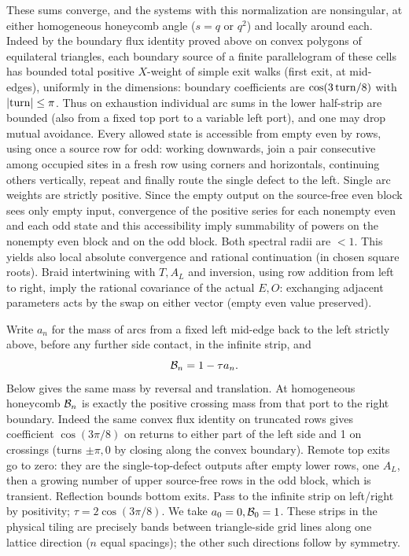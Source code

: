 \documentclass[11pt]{article}
\numberwithin{equation}{section}
\theoremstyle{definition}\newtheorem{definition}[theorem]{Definition}
\theoremstyle{remark}\newtheorem{remark}[theorem]{Remark}
\begin{document}
These sums converge, and the systems with this normalization are nonsingular, at either homogeneous honeycomb angle (\(s=q\) or \(q^2\)) and locally around each. Indeed by the boundary flux identity proved above on convex polygons of equilateral triangles, each boundary source of a finite parallelogram of these cells has bounded total positive \(X\)-weight of simple exit walks (first exit, at mid-edges), uniformly in the dimensions: boundary coefficients are \(\cos(3\,{\rm turn}/8)\) with \(|{\rm turn}|\le\pi\). Thus on exhaustion individual arc sums in the lower half-strip are bounded (also from a fixed top port to a variable left port), and one may drop mutual avoidance. Every allowed state is accessible from empty even by rows, using once a source row for odd: working downwards, join a pair consecutive among occupied sites in a fresh row using corners and horizontals, continuing others vertically, repeat and finally route the single defect to the left. Single arc weights are strictly positive. Since the empty output on the source-free even block sees only empty input, convergence of the positive series for each nonempty even and each odd state and this accessibility imply summability of powers on the nonempty even block and on the odd block. Both spectral radii are \(<1\). This yields also local absolute convergence and rational continuation (in chosen square roots). Braid intertwining with \(T,A_L\) and inversion, using row addition from left to right, imply the rational covariance of the actual \(E,O\): exchanging adjacent parameters acts by the swap on either vector (empty even value preserved).

Write \(a_n\) for the mass of arcs from a fixed left mid-edge back to the left strictly above, before any further side contact, in the infinite strip, and
\[
 {\cal B}_n=1-\tau a_n.
\]
Below gives the same mass by reversal and translation. At homogeneous honeycomb \({\cal B}_n\) is exactly the positive crossing mass from that port to the right boundary. Indeed the same convex flux identity on truncated rows gives coefficient \(\cos(3\pi/8)\) on returns to either part of the left side and 1 on crossings (turns \(\pm\pi,0\) by closing along the convex boundary). Remote top exits go to zero: they are the single-top-defect outputs after empty lower rows, one \(A_L\), then a growing number of upper source-free rows in the odd block, which is transient. Reflection bounds bottom exits. Pass to the infinite strip on left/right by positivity; \(\tau=2\cos(3\pi/8)\). We take \(a_0=0,{\cal B}_0=1\).
These strips in the physical tiling are precisely bands between triangle-side grid lines along one lattice direction (\(n\) equal spacings); the other such directions follow by symmetry.
\end{document}
